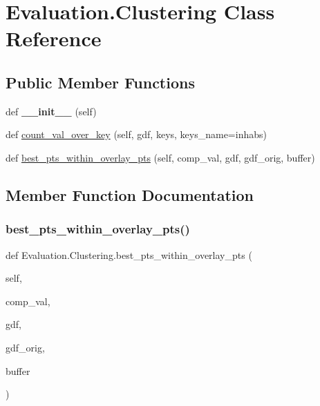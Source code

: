 \hypertarget{class_evaluation_1_1_clustering}{}\section{Evaluation.\+Clustering Class Reference}
\label{class_evaluation_1_1_clustering}
\subsection*{Public Member Functions}
\begin{DoxyCompactItemize}
\item 
\mbox{\label{class_evaluation_1_1_clustering_a41b9f316086ed5182b99a42f0efb2dac}} 
def {\bfseries \+\_\+\+\_\+init\+\_\+\+\_\+} (self)
\item 
def \hyperlink{class_evaluation_1_1_clustering_a97093141aaad40fcc7a8df2f214200bb}{count\+\_\+val\+\_\+over\+\_\+key} (self, gdf, keys, keys\+\_\+name=\textquotesingle{}inhabs\textquotesingle{})
\item 
def \hyperlink{class_evaluation_1_1_clustering_a3d6ec28e9a32376495a19b1b38f20967}{best\+\_\+pts\+\_\+within\+\_\+overlay\+\_\+pts} (self, comp\+\_\+val, gdf, gdf\+\_\+orig, buffer)
\end{DoxyCompactItemize}


\subsection{Member Function Documentation}
\mbox{\label{class_evaluation_1_1_clustering_a3d6ec28e9a32376495a19b1b38f20967}} 
\subsubsection{\texorpdfstring{best\+\_\+pts\+\_\+within\+\_\+overlay\+\_\+pts()}{best\_pts\_within\_overlay\_pts()}}
{\footnotesize\ttfamily def Evaluation.\+Clustering.\+best\+\_\+pts\+\_\+within\+\_\+overlay\+\_\+pts (\begin{DoxyParamCaption}\item[{}]{self,  }\item[{}]{comp\+\_\+val,  }\item[{}]{gdf,  }\item[{}]{gdf\+\_\+orig,  }\item[{}]{buffer }\end{DoxyParamCaption})}


